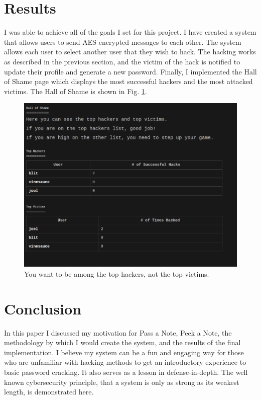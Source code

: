 \documentclass[conference]{csce}
\begin{document}
\section{Results}
I was able to achieve all of the goals I set for this project. I have created a system that allows users to send AES encrypted messages to each other. The system allows each user to select another user that they wish to hack. The hacking works as described in the previous section, and the victim of the hack is notified to update their profile and generate a new password. Finally, I implemented the Hall of Shame page which displays the most successful hackers and the most attacked victims. The Hall of Shame is shown in Fig. \ref{fig:hos}. \\
\begin{figure}
    \centering
    \includegraphics[width=\columnwidth]{hall_of_shame.png}
    \caption{You want to be among the top hackers, not the top victims.}
    \label{fig:hos}
\end{figure}

\section{Conclusion}
In this paper I discussed my motivation for Pass a Note, Peek a Note, the methodology by which I would create the system, and the results of the final implementation. I believe my system can be a fun and engaging way for those who are unfamiliar with hacking methods to get an introductory experience to basic password cracking. It also serves as a lesson in defense-in-depth. The well known cybersecurity principle, that a system is only as strong as its weakest length, is demonstrated here.\\
\end{document}
